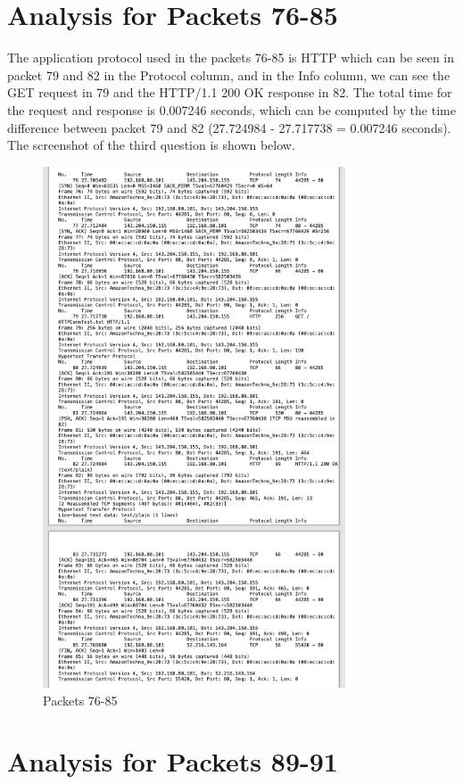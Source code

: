 \documentclass{article}
\begin{document}
\begin{CJK*}{UTF8}{gbsn}
\section{Analysis for Packets 76-85}
The application protocol used in the packets 76-85 is HTTP which
can be seen in packet 79 and 82 in the Protocol column, and in the Info
column, we can see the GET request in 79 and the HTTP/1.1 200 OK response in 82.
The total time for the request and response is 0.007246 seconds,
which can be computed by the time difference between packet 79 and 82
(27.724984 - 27.717738 = 0.007246 seconds). The screenshot of the
third question is shown below.
\begin{figure}[H]
    \centering
    \includegraphics[width=0.8\textwidth]{Q3.png}
    \caption{Packets 76-85}
\end{figure}

\section{Analysis for Packets 89-91}

\end{CJK*}
\end{document}
